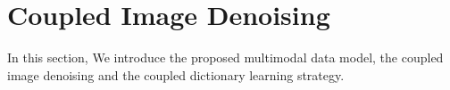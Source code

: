 \documentclass{article}
\begin{document}



%


\section{Coupled Image Denoising}
\label{sec:SIMIS}

\vspace{-0.2cm}

In this section, We introduce the proposed multimodal data model, the coupled image denoising and the coupled dictionary learning strategy.
%
\end{document}
